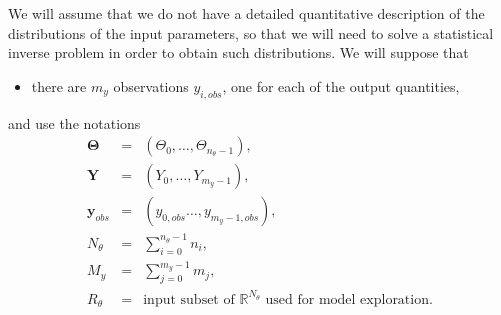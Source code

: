 We will assume that we do not have a detailed quantitative description of the distributions of the input parameters, so that we will need to solve a statistical inverse problem
in order to obtain such distributions. 
We will suppose that
\begin{itemize}
\item there are $m_{y}$ observations $y_{i,obs}$, one for each of the output quantities,
\end{itemize}
and use the notations
\begin{eqnarray*}
\boldsymbol{\Theta} & =      & (\Theta_0,\ldots,\Theta_{n_\theta-1}), \\
\mathbf{Y}          & =      & (Y_0,     \ldots,Y_{m_y-1}          ), \\
\mathbf{y}_{obs}    & =      & (y_{0,obs}\ldots,y_{m_y-1,obs}      ), \\
N_{\theta}          & =      & \sum_{i=0}^{n_{\theta}-1}n_i,          \\
M_y                 & =      & \sum_{j=0}^{m_y       -1}m_j,          \\
R_{\theta}          & =      & \mbox{input subset of }\mathbb{R}^{N_{\theta}}\mbox{ used for model exploration}.
\end{eqnarray*}

